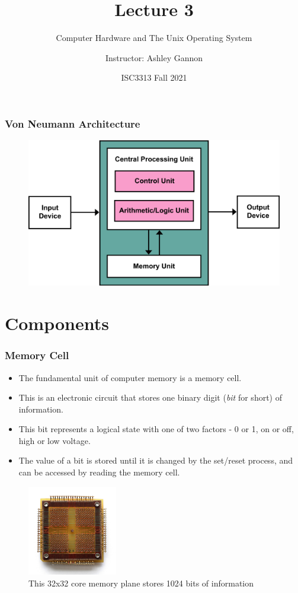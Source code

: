 \documentclass{if-beamer}
\title[Lecture 3]{Lecture 3}
\subtitle{Computer Hardware and The Unix Operating System}
\author{Instructor: Ashley Gannon}
\date{ISC3313 Fall 2021}
\begin{document}
\begin{frame}
  \titlepage
\end{frame}
\begin{frame}
	\frametitle{Von Neumann Architecture}
	\begin{figure}
		\centering
		\includegraphics{figures/vonNeumannArch.png}
	\end{figure}
\end{frame}
\section{Components}
\begin{frame}
\frametitle{Memory Cell}
\begin{itemize}
	\item The fundamental unit of computer memory is a memory cell.
	\item This is an electronic circuit that stores one binary digit (\textit{bit} for short) of information.
	\item This bit represents a logical state with one of two factors - 0 or 1, on or off, high or low voltage.
	\item The value of a bit is stored until it is changed by the set/reset process, and can be accessed by reading the memory cell.
\end{itemize}

\begin{figure}
	\center
	\includegraphics[width=0.35\textwidth]{figures/memory.jpg}
	\caption{\tiny This 32x32 core memory plane stores 1024 bits of information}
\end{figure}
\end{frame}
\end{document}
